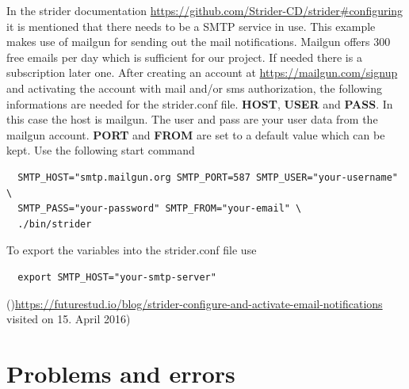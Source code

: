 In the strider documentation \url{https://github.com/Strider-CD/strider#configuring} it is mentioned that there needs to be a SMTP service in use. This
example makes use of mailgun for sending out the mail notifications. Mailgun offers 300 free emails per day which is sufficient for our project. If needed
there is a subscription later one. After creating an account at \url{https://mailgun.com/signup} and activating the account with mail and/or sms authorization,
the following informations are needed for the strider.conf file. \textbf{HOST}, \textbf{USER} and \textbf{PASS}. In this case the host is mailgun. The user
and pass are your user data from the mailgun account. \textbf{PORT} and \textbf{FROM} are set to a default value which can be kept.
Use the following start command

\begin{lstlisting}
  SMTP_HOST="smtp.mailgun.org SMTP_PORT=587 SMTP_USER="your-username" \
  SMTP_PASS="your-password" SMTP_FROM="your-email" \
  ./bin/strider
\end{lstlisting}

To export the variables into the strider.conf file use

\begin{lstlisting}
  export SMTP_HOST="your-smtp-server"
\end{lstlisting}

()\url{https://futurestud.io/blog/strider-configure-and-activate-email-notifications} visited on 15. April 2016)

\newpage
\section{Problems and errors}
\label{section:Problems and errors}

